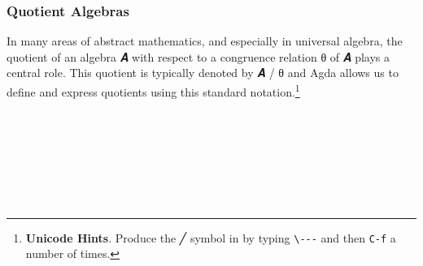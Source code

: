 \subsubsection{Quotient Algebras}\label{quotient-algebras}
In many areas of abstract mathematics, and especially in universal algebra, the quotient of an algebra \ab 𝑨 with respect to a congruence relation \ab θ of \ab 𝑨 plays a central role. This quotient is typically denoted by \ab 𝑨 \af / \ab θ and Agda allows us to define and express quotients using this standard notation.\footnote{%
\textbf{Unicode Hints}. Produce the ╱ symbol in \agdamode by typing \texttt{\textbackslash{}-\/-\/-} and then \texttt{C-f} a number of times.}
\ccpad
\begin{code}%
\>[0]\AgdaSpace{}%
\AgdaModule{\AgdaUnderscore{}}\AgdaSpace{}%
\AgdaSymbol{\{}\AgdaSpace{}%
\AgdaSpace{}%
\AgdaSymbol{:}\AgdaSpace{}%
\AgdaSymbol{\}}\AgdaSpace{}%
\<%
\\
%
\\[\AgdaEmptyExtraSkip]%
\>[0][@{}l@{\AgdaIndent{0}}]%
\>[1]\AgdaSpace{}%
\AgdaSymbol{:}\AgdaSpace{}%
\AgdaSymbol{(}\AgdaSpace{}%
\AgdaSymbol{:}\AgdaSpace{}%
\AgdaSpace{}%
\AgdaSpace{}%
\AgdaSymbol{)}\AgdaSpace{}%
\AgdaSpace{}%
\AgdaSymbol{\{}\AgdaSymbol{\}\{}\AgdaSymbol{\}}\AgdaSpace{}%
\AgdaSpace{}%
\AgdaSpace{}%
\AgdaSpace{}%
\AgdaSymbol{(}\AgdaSpace{}%
\AgdaSpace{}%
\AgdaSpace{}%
\AgdaSymbol{)}\AgdaSpace{}%
\<%
\\
%
\\[\AgdaEmptyExtraSkip]%
%
\>[1]\AgdaSpace{}%
\AgdaSpace{}%
\AgdaSpace{}%
\AgdaSymbol{=}%
\>[219I]\AgdaSymbol{(}\AgdaSpace{}%
\AgdaSpace{}%
\AgdaSpace{}%
\AgdaSpace{}%
\AgdaOperator{\AgdaFunction{/}}\AgdaSpace{}%
\AgdaSpace{}%
\AgdaSpace{}%
\AgdaSpace{}%
\AgdaSymbol{)}\AgdaSpace{}%
\AgdaOperator{\AgdaInductiveConstructor{,}}%
\>[50]\<%
\\
%
\\[\AgdaEmptyExtraSkip]%

\end{code}
